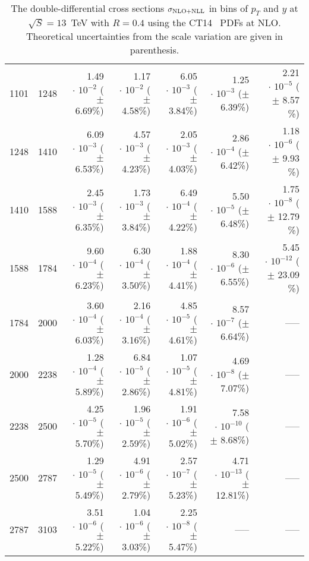 \begin{table}[h!]
\begin{center}
\begin{tabular}{|r|r|r|r|r|r|r|}
1101 & 1248 & 1.49$\,\cdot\, 10^{-2}$  ($\pm\!\!$  6.69\%) & 1.17$\,\cdot\, 10^{-2}$  ($\pm\!\!$  4.58\%) & 6.05$\,\cdot\, 10^{-3}$  ($\pm\!\!$  3.84\%) & 1.25$\,\cdot\, 10^{-3}$  ($\pm\!\!$  6.39\%) & 2.21$\,\cdot\, 10^{-5}$  ($\pm\!\!$  8.57 \%)\\
1248 & 1410 & 6.09$\,\cdot\, 10^{-3}$  ($\pm\!\!$  6.53\%) & 4.57$\,\cdot\, 10^{-3}$  ($\pm\!\!$  4.23\%) & 2.05$\,\cdot\, 10^{-3}$  ($\pm\!\!$  4.03\%) & 2.86$\,\cdot\, 10^{-4}$  ($\pm\!\!$  6.42\%) & 1.18$\,\cdot\, 10^{-6}$  ($\pm\!\!$  9.93 \%)\\
1410 & 1588 & 2.45$\,\cdot\, 10^{-3}$  ($\pm\!\!$  6.35\%) & 1.73$\,\cdot\, 10^{-3}$  ($\pm\!\!$  3.84\%) & 6.49$\,\cdot\, 10^{-4}$  ($\pm\!\!$  4.22\%) & 5.50$\,\cdot\, 10^{-5}$  ($\pm\!\!$  6.48\%) & 1.75$\,\cdot\, 10^{-8}$  ($\pm\!\!$ 12.79 \%)\\
1588 & 1784 & 9.60$\,\cdot\, 10^{-4}$  ($\pm\!\!$  6.23\%) & 6.30$\,\cdot\, 10^{-4}$  ($\pm\!\!$  3.50\%) & 1.88$\,\cdot\, 10^{-4}$  ($\pm\!\!$  4.41\%) & 8.30$\,\cdot\, 10^{-6}$  ($\pm\!\!$  6.55\%) & 5.45$\,\cdot\, 10^{-12}$  ($\pm\!\!$ 23.09 \%)\\
1784 & 2000 & 3.60$\,\cdot\, 10^{-4}$  ($\pm\!\!$  6.03\%) & 2.16$\,\cdot\, 10^{-4}$  ($\pm\!\!$  3.16\%) & 4.85$\,\cdot\, 10^{-5}$  ($\pm\!\!$  4.61\%) & 8.57$\,\cdot\, 10^{-7}$  ($\pm\!\!$  6.64\%) & -----\\
2000 & 2238 & 1.28$\,\cdot\, 10^{-4}$  ($\pm\!\!$  5.89\%) & 6.84$\,\cdot\, 10^{-5}$  ($\pm\!\!$  2.86\%) & 1.07$\,\cdot\, 10^{-5}$  ($\pm\!\!$  4.81\%) & 4.69$\,\cdot\, 10^{-8}$  ($\pm\!\!$  7.07\%) & -----\\
2238 & 2500 & 4.25$\,\cdot\, 10^{-5}$  ($\pm\!\!$  5.70\%) & 1.96$\,\cdot\, 10^{-5}$  ($\pm\!\!$  2.59\%) & 1.91$\,\cdot\, 10^{-6}$  ($\pm\!\!$  5.02\%) & 7.58$\,\cdot\, 10^{-10}$  ($\pm\!\!$  8.68\%) & -----\\
2500 & 2787 & 1.29$\,\cdot\, 10^{-5}$  ($\pm\!\!$  5.49\%) & 4.91$\,\cdot\, 10^{-6}$  ($\pm\!\!$  2.79\%) & 2.57$\,\cdot\, 10^{-7}$  ($\pm\!\!$  5.23\%) & 4.71$\,\cdot\, 10^{-13}$  ($\pm\!\!$ 12.81\%) & -----\\
2787 & 3103 & 3.51$\,\cdot\, 10^{-6}$  ($\pm\!\!$  5.22\%) & 1.04$\,\cdot\, 10^{-6}$  ($\pm\!\!$  3.03\%) & 2.25$\,\cdot\, 10^{-8}$  ($\pm\!\!$  5.47\%) & ----- & -----\\
%
\hline
\end{tabular}
\caption{\label{tab:cms13-ct14-r04-nll}
   The double-differential cross sections $\sigma_{\rm NLO + NLL}$ 
   in bins of $p_T$ and $y$ at $\sqrt{S}=13$~TeV 
   with $R= 0.4$ using the CT14~\cite{Dulat:2015mca} PDFs at NLO.
   Theoretical uncertainties from the scale variation are given in
   parenthesis.
 }
\end{center}
\end{table}
